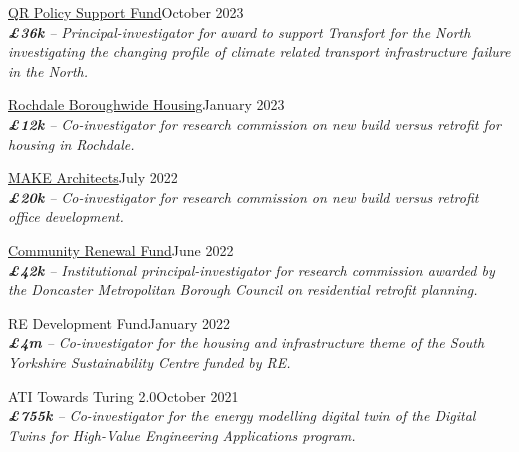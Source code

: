 \documentclass[10pt]{article}
\newcommand{\blankline}{\quad\pagebreak[3]}
\begin{document}
\blankline

\href{}{QR Policy Support Fund}\hfill {October 2023}\\
\emph{\textbf{\pounds36k} -- Principal-investigator for award to support Transfort for the North investigating the changing profile of climate related transport infrastructure failure in the North.}
\FPset{}
\FPset{}

\blankline

\href{}{Rochdale Boroughwide Housing}\hfill {January 2023}\\
\emph{\textbf{\pounds12k} -- Co-investigator for research commission on new build versus retrofit for housing in Rochdale.}%
\FPset{}
\FPset{}

\blankline

\href{}{MAKE Architects}\hfill {July 2022}\\
\emph{\textbf{\pounds20k} -- Co-investigator for research commission on new build versus retrofit office development.}%
\FPset{}
\FPset{}

\blankline

\href{}{Community Renewal Fund}\hfill {June 2022}\\
\emph{\textbf{\pounds42k} -- Institutional principal-investigator for research commission awarded by the Doncaster Metropolitan Borough Council on residential retrofit planning.}
\FPset{}
\FPset{}

%

\blankline

RE Development Fund\hfill {January 2022}\\
\emph{\textbf{\pounds4m} -- Co-investigator for the housing and infrastructure theme of the South Yorkshire Sustainability Centre funded by RE.}
\FPset{}
\FPset{}

\blankline

ATI Towards Turing 2.0\hfill {October 2021}\\
\emph{\textbf{\pounds755k} -- Co-investigator for the energy modelling digital twin of the Digital Twins for High-Value Engineering Applications program.}
\FPset{}
\FPset{}
\end{document}
